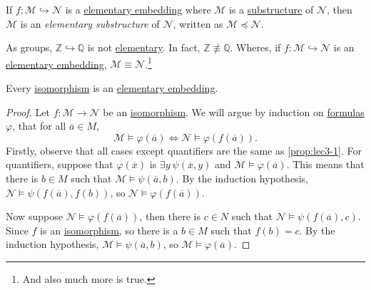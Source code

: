 \begin{definition}\label{def:elementary-substructure}
	If \(f\colon \mathcal{M} \hookrightarrow \mathcal{N} \) is a \hyperref[def:elementary-embedding]{elementary embedding} where \(\mathcal{M}\) is a \hyperref[def:substructure]{substructure} of \(\mathcal{N} \), then \(\mathcal{M} \) is an \emph{elementary substructure} of \(\mathcal{N} \), written as \(\mathcal{M} \preceq \mathcal{N} \).
\end{definition}

\begin{eg}
	As groups, \(\mathbb{Z} \hookrightarrow \mathbb{Q} \) is not \hyperref[def:elementary-embedding]{elementary}. In fact, \(\mathbb{Z} \not\equiv \mathbb{Q} \). Wheres, if \(f\colon \mathcal{M} \hookrightarrow \mathcal{N} \) is an \hyperref[def:elementary-embedding]{elementary embedding}, \(\mathcal{M} \equiv \mathcal{N} \).\footnote{And also much more is true.}
\end{eg}

\begin{proposition}\label{prop:isomorphism-is-elementary-embedding}
	Every \hyperref[def:isomorphism]{isomorphism} is an \hyperref[def:elementary-embedding]{elementary embedding}.
\end{proposition}
\begin{proof}
	Let \(f\colon \mathcal{M} \to  \mathcal{N} \) be an \hyperref[def:isomorphism]{isomorphism}. We will argue by induction on \hyperref[def:formula]{formulas} \(\varphi \), that for all \(\overline{a} \in M\),
	\[
		\mathcal{M} \models \varphi (\overline{a} ) \iff \mathcal{N} \models \varphi (f(\overline{a} )).
	\]
	Firstly, observe that all cases except quantifiers are the same as \autoref{prop:lec3-1}. For quantifiers, suppose that \(\varphi (\overline{x} )\) is \(\exists y\ \psi (\overline{x} , y)\) and \(\mathcal{M} \models \varphi (\overline{a} )\). This means that there is \(b\in M\) such that \(\mathcal{M} \models \psi (\overline{a} , b)\). By the induction hypothesis, \(\mathcal{N} \models \psi (f(\overline{a}) , f(b))\), so \(\mathcal{N} \models \varphi (f(\overline{a} ))\).

	Now suppose \(\mathcal{N} \models \varphi (f(\overline{a} ))\), then there is \(c\in N\) such that \(\mathcal{N} \models \psi (f(\overline{a} ), c)\). Since \(f\) is an \hyperref[def:isomorphism]{isomorphism}, so there is a \(b\in M\) such that \(f(b) = c\). By the induction hypothesis, \(\mathcal{M} \models \psi (\overline{a} , b)\), so \(\mathcal{M} \models \varphi (\overline{a} )\).
\end{proof}

